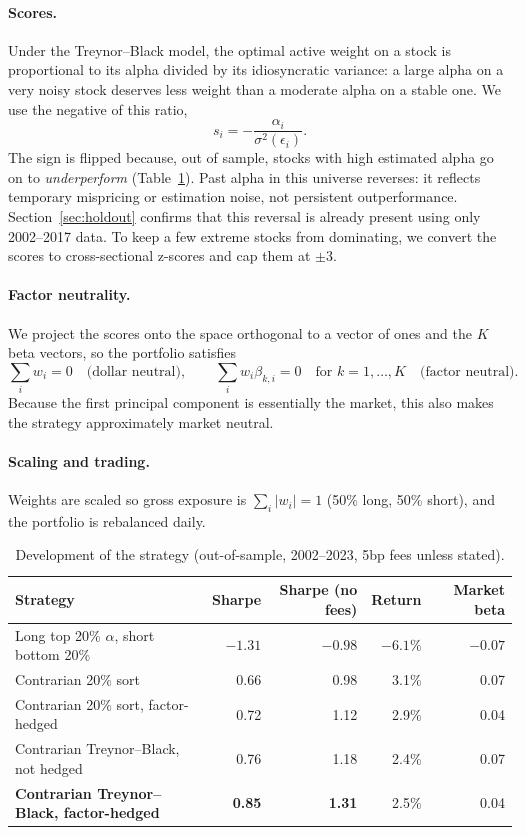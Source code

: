 \documentclass[12pt,letterpaper]{article}
\begin{document}
\paragraph{Scores.} Under the Treynor--Black model, the optimal active weight on a stock is proportional to its alpha divided by its idiosyncratic variance: a large alpha on a very noisy stock deserves less weight than a moderate alpha on a stable one. We use the negative of this ratio,
\[
    s_i = -\frac{\alpha_i}{\sigma^2(\epsilon_i)}.
\]
The sign is flipped because, out of sample, stocks with high estimated alpha go on to \emph{underperform} (Table~\ref{tab:development}). Past alpha in this universe reverses: it reflects temporary mispricing or estimation noise, not persistent outperformance. Section~\ref{sec:holdout} confirms that this reversal is already present using only 2002--2017 data. To keep a few extreme stocks from dominating, we convert the scores to cross-sectional z-scores and cap them at $\pm 3$.

\paragraph{Factor neutrality.} We project the scores onto the space orthogonal to a vector of ones and the $K$ beta vectors, so the portfolio satisfies
\[
    \sum_i w_i = 0 \quad \text{(dollar neutral)}, \qquad \sum_i w_i \beta_{k,i} = 0 \quad \text{for } k = 1, \dots, K \quad \text{(factor neutral)}.
\]
Because the first principal component is essentially the market, this also makes the strategy approximately market neutral.

\paragraph{Scaling and trading.} Weights are scaled so gross exposure is $\sum_i |w_i| = 1$ (50\% long, 50\% short), and the portfolio is rebalanced daily.

\begin{table}[H]
\centering
\caption{Development of the strategy (out-of-sample, 2002--2023, 5bp fees unless stated).}
\label{tab:development}
\begin{tabular}{lrrrr}
\toprule
Strategy & Sharpe & Sharpe (no fees) & Return & Market beta \\
\midrule
Long top 20\% $\alpha$, short bottom 20\% & $-1.31$ & $-0.98$ & $-6.1\%$ & $-0.07$ \\
Contrarian 20\% sort & 0.66 & 0.98 & 3.1\% & 0.07 \\
Contrarian 20\% sort, factor-hedged & 0.72 & 1.12 & 2.9\% & 0.04 \\
Contrarian Treynor--Black, not hedged & 0.76 & 1.18 & 2.4\% & 0.07 \\
\textbf{Contrarian Treynor--Black, factor-hedged} & \textbf{0.85} & \textbf{1.31} & 2.5\% & 0.04 \\
\bottomrule
\end{tabular}
\end{table}
\end{document}
